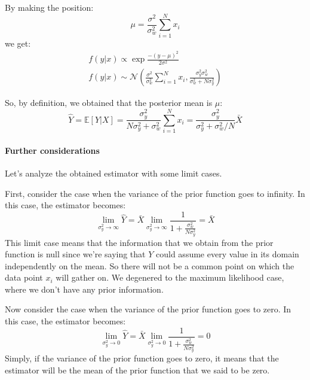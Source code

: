 By making the position:
\[
    \mu = \frac{\sigma^2}{\sigma_w^2}\sum_{i=1}^{N} x_i
\]
we get:
\begin{gather*}
    f(y|x) \propto \exp{\frac{-(y-\mu)^2}{2\sigma^2}} \\
    f(y|x) \sim \mathcal N \left(\frac{\sigma^2}{\sigma_w^2}\sum_{i=1}^{N} x_i,  \frac{\sigma^2_y\sigma^2_w}{\sigma^2_w+N\sigma^2_y}\right)
\end{gather*}

So, by definition, we obtained that the posterior mean is $\mu$:
\[
    \hat{Y} = \mathbb{E}\left[ Y | X\right] = \frac{\sigma_y^2}{N\sigma_y^2 + \sigma_w^2} \sum_{i=1}^{N} x_i = \frac{\sigma_y^2}{\sigma_y^2 + \sigma_w^2/N} \bar X
\]

\paragraph*{Further considerations}
Let's analyze the obtained estimator with some limit cases.

First, consider the case when the variance of the prior function goes to infinity. In this case, the estimator becomes:
\[
    \lim_{\sigma^2_y\to\infty} \hat Y = \bar X   \lim_{\sigma^2_y\to\infty} \frac 1{1+\frac{\sigma^2_w}{N\sigma^2_y}} = \bar X
\]
This limit case means that the information that we obtain from the prior function is null since we're saying that $Y$ could assume every value in its domain independently on the mean. So there will not be a common point on which the data point $x_i$ will gather on.
We degenered to the maximum likelihood case, where we don't have any prior information.

Now consider the case when the variance of the prior function goes to zero. In this case, the estimator becomes:
\[
    \lim_{\sigma^2_y\to0} \hat Y = \bar X \lim_{\sigma^2_y\to 0}\frac{1}{1+\frac{\sigma^2_w}{N\sigma^2_y}} = 0
\]
Simply, if the variance of the prior function goes to zero, it means that the estimator will be the mean of the prior function that we said to be zero.

